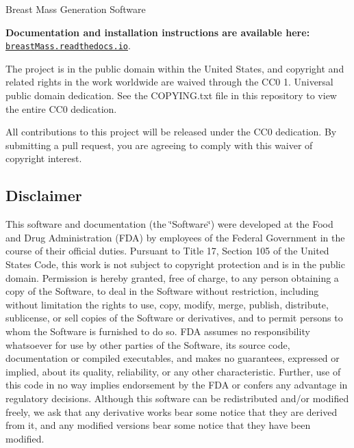 Breast Mass Generation Software

{\bfseries Documentation and installation instructions are available here\-:} \href{https://breastMass.readthedocs.io}{\tt breast\-Mass.\-readthedocs.\-io}.

The project is in the public domain within the United States, and copyright and related rights in the work worldwide are waived through the C\-C0 1. Universal public domain dedication. See the C\-O\-P\-Y\-I\-N\-G.\-txt file in this repository to view the entire C\-C0 dedication.

All contributions to this project will be released under the C\-C0 dedication. By submitting a pull request, you are agreeing to comply with this waiver of copyright interest.

\subsection*{Disclaimer}

This software and documentation (the \char`\"{}\-Software\char`\"{}) were developed at the Food and Drug Administration (F\-D\-A) by employees of the Federal Government in the course of their official duties. Pursuant to Title 17, Section 105 of the United States Code, this work is not subject to copyright protection and is in the public domain. Permission is hereby granted, free of charge, to any person obtaining a copy of the Software, to deal in the Software without restriction, including without limitation the rights to use, copy, modify, merge, publish, distribute, sublicense, or sell copies of the Software or derivatives, and to permit persons to whom the Software is furnished to do so. F\-D\-A assumes no responsibility whatsoever for use by other parties of the Software, its source code, documentation or compiled executables, and makes no guarantees, expressed or implied, about its quality, reliability, or any other characteristic. Further, use of this code in no way implies endorsement by the F\-D\-A or confers any advantage in regulatory decisions. Although this software can be redistributed and/or modified freely, we ask that any derivative works bear some notice that they are derived from it, and any modified versions bear some notice that they have been modified. 